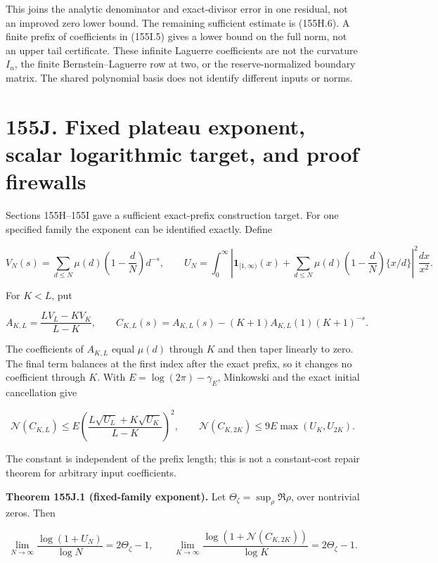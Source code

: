 \documentclass[
  11pt,
]{book}
\begin{document}
This joins the analytic denominator and exact-divisor error in one
residual, not an improved zero lower bound. The remaining sufficient
estimate is (155H.6). A finite prefix of coefficients in (155I.5) gives
a lower bound on the full norm, not an upper tail certificate. These
infinite Laguerre coefficients are not the curvature \(I_n\), the finite
Bernstein--Laguerre row at two, or the reserve-normalized boundary
matrix. The shared polynomial basis does not identify different inputs
or norms.

\section{155J. Fixed plateau exponent, scalar logarithmic target, and
proof
firewalls}\label{j.-fixed-plateau-exponent-scalar-logarithmic-target-and-proof-firewalls}

Sections 155H--155I gave a sufficient exact-prefix construction target.
For one specified family the exponent can be identified exactly. Define

\[
V_N(s)=\sum_{d\le N}\mu(d)\left(1-\frac dN\right)d^{-s},
\qquad
U_N=\int_0^\infty\left|\mathbf1_{[1,\infty)}(x)
+\sum_{d\le N}\mu(d)\left(1-\frac dN\right)\{x/d\}
\right|^2\frac{dx}{x^2}.
\tag{155J.1}
\]

For \(K<L\), put

\[
A_{K,L}=\frac{LV_L-KV_K}{L-K},
\qquad
C_{K,L}(s)=A_{K,L}(s)-(K+1)A_{K,L}(1)(K+1)^{-s}.
\tag{155J.2}
\]

The coefficients of \(A_{K,L}\) equal \(\mu(d)\) through \(K\) and then
taper linearly to zero. The final term balances at the first index after
the exact prefix, so it changes no coefficient through \(K\). With
\(E=\log(2\pi)-\gamma_E\), Minkowski and the exact initial cancellation
give

\[
\boxed{\mathscr N(C_{K,L})\le E
\left(\frac{L\sqrt{U_L}+K\sqrt{U_K}}{L-K}\right)^2},
\qquad
\mathscr N(C_{K,2K})\le9E\max(U_K,U_{2K}).
\tag{155J.3}
\]

The constant is independent of the prefix length; this is not a
constant-cost repair theorem for arbitrary input coefficients.

\textbf{Theorem 155J.1 (fixed-family exponent).} Let
\(\Theta_\zeta=\sup_{\rho}\Re\rho\), over nontrivial zeros. Then

\[
\boxed{\lim_{N\to\infty}\frac{\log(1+U_N)}{\log N}
=2\Theta_\zeta-1,
\qquad
\lim_{K\to\infty}\frac{\log(1+\mathscr N(C_{K,2K}))}{\log K}
=2\Theta_\zeta-1.}
\tag{155J.4}
\]
\end{document}
